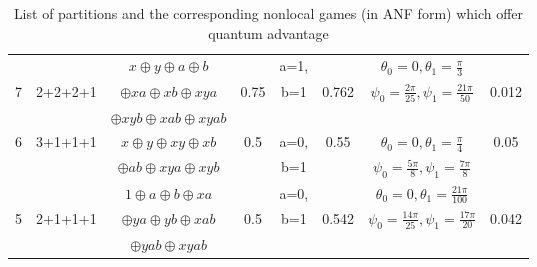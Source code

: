 \documentclass[]{svjour3}
\begin{document}
\begin{center}
\begin{table}[htbp]
{\begin{tabular}{ |c|c|c|c|c|c|c|c| }
				\hline
				~ & ~ & $x \oplus y \oplus a \oplus b$ & ~ & a=1, & ~ & $\theta_0 = 0,\theta_1 = \frac{\pi}{3}$ & ~\\
				7 & 2+2+2+1 & $\oplus xa \oplus xb \oplus xya$ & 0.75 & b=1 & 0.762 & $\psi_0 = \frac{2\pi}{25},\psi_1 = \frac{21\pi}{50}$ & 0.012\\
				~ & ~ & $\oplus xyb \oplus xab \oplus xyab$ & ~ & ~ & ~ & ~ & ~\\
				\hline
				6 & 3+1+1+1 & $x \oplus y \oplus xy \oplus xb$ & 0.5 & a=0, & 0.55 & $\theta_0 = 0,\theta_1 = \frac{\pi}{4}$ & 0.05\\
				~ & ~ & $\oplus ab \oplus xya \oplus xyb$ & ~ & b=1 & ~ & $\psi_0 = \frac{5\pi}{8},\psi_1 = \frac{7\pi}{8}$ & ~\\
				\hline
				~ & ~ & $1 \oplus a \oplus b \oplus xa$ & ~ & a=0, & ~ & $\theta_0 = 0,\theta_1 = \frac{21\pi}{100}$ & ~\\
				5 & 2+1+1+1 & $\oplus ya \oplus yb \oplus xab$ & 0.5 & b=1 & 0.542 & $\psi_0 = \frac{14\pi}{25},\psi_1 = \frac{17\pi}{20}$ & 0.042\\
				~ & ~ & $\oplus yab \oplus xyab$ & ~ & ~ & ~ & ~ & ~\\
				\hline
		\end{tabular}}
	\caption{List of partitions and the corresponding nonlocal games (in ANF form) which offer quantum advantage} 
	\label{separation}
\end{table}
\end{center}



\end{document}
